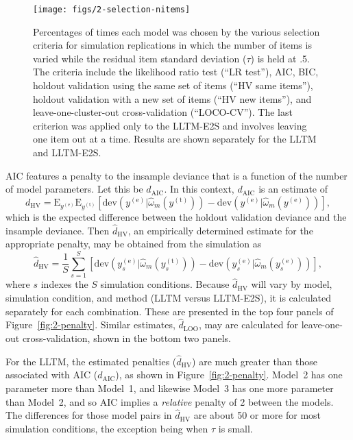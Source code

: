 \begin{figure}
	\centering
	\texttt{[image: figs/2-selection-nitems]}
	\caption{Percentages of times each model was chosen by the various selection criteria for simulation replications in which the number of items is varied while the residual item standard deviation ($\tau$) is held at .5. The criteria include the likelihood ratio test (``LR test''), AIC, BIC, holdout validation using the same set of items (``HV same items''), holdout validation with a new set of items (``HV new items''), and leave-one-cluster-out cross-validation (``LOCO-CV''). The last criterion was applied only to the LLTM-E2S and involves leaving one item out at a time. Results are shown separately for the LLTM and LLTM-E2S.}
	\label{fig:2-selection-nitems}
\end{figure}

AIC features a penalty to the insample deviance that is a function of the number of model parameters. Let this be $d_\mathrm{AIC}$. In this context, $d_\mathrm{AIC}$ is an estimate of
\begin{equation}
	d_{\mathrm{HV}} = \mathrm{E}_{y^{(\mathrm{e})}} \mathrm{E}_{y^{(\mathrm{t})}} 
	[
		\mathrm{dev}(y^{(\mathrm{e})} | \hat \omega_m(y^{(\mathrm{t})})) -
		\mathrm{dev}(y^{(\mathrm{e})} | \hat \omega_m(y^{(\mathrm{e})}))
	]
,\end{equation}
which is the expected difference between the holdout validation deviance and the insample deviance. Then $\hat d_{\mathrm{HV}}$, an empirically determined estimate for the appropriate penalty, may be obtained from the simulation as
\begin{equation}
	\hat d_{\mathrm{HV}} = \frac{1}{S} \sum_{s=1}^{S} 
	\left [
		\mathrm{dev}(y^{(\mathrm{e})}_s | \hat \omega_m(y^{(\mathrm{t})}_s)) -
		\mathrm{dev}(y^{(\mathrm{e})}_s | \hat \omega_m(y^{(\mathrm{e})}_s))
	\right ]
,\end{equation}
where $s$ indexes the $S$ simulation conditions.
Because $\hat d_{\mathrm{HV}}$ will vary by model, simulation condition, and method (LLTM versus LLTM-E2S), it is calculated separately for each combination. These are presented in the top four panels of Figure~\ref{fig:2-penalty}. Similar estimates, $\hat d_{\mathrm{LOO}}$, may are calculated for leave-one-out cross-validation, shown in the bottom two panels.

For the LLTM, the estimated penalties ($\hat d_{\mathrm{HV}}$) are much greater than those associated with AIC ($d_\mathrm{AIC}$), as shown in Figure~\ref{fig:2-penalty}. Model~2 has one parameter more than Model~1, and likewise Model~3 has one more parameter than Model~2, and so AIC implies a \emph{relative} penalty of 2 between the models. The differences for those model pairs in $\hat d_{\mathrm{HV}}$ are about 50 or more for most simulation conditions, the exception being when $\tau$ is small.

